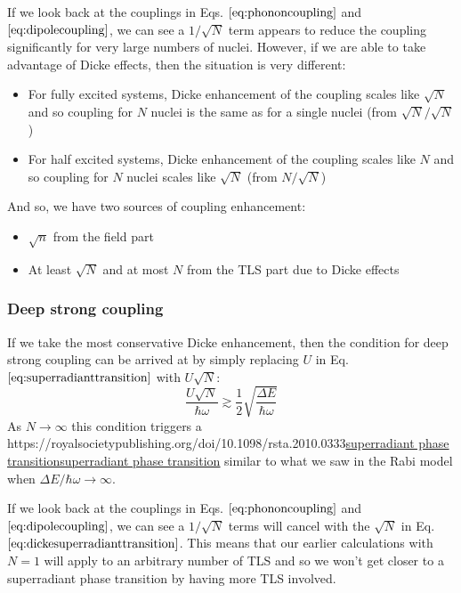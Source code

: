 \documentclass[
]{article}
\let\oldhref\href
\renewcommand{\href}[2]{\ifx#1\urlprefix\oldhref{#1}{#2}\else\uline{\oldhref{#1}{#2}}\fi}
\renewcommand{\[}{\begin{equation}}
\renewcommand{\]}{\end{equation}}
\providecommand{\tightlist}{%
  \setlength{\itemsep}{0pt}\setlength{\parskip}{0pt}}
\begin{document}
If we look back at the couplings in Eqs. \(\ref{eq:phononcoupling}\) and
\(\ref{eq:dipolecoupling}\), we can see a \(1/\sqrt{N}\) term appears to
reduce the coupling significantly for very large numbers of nuclei.
However, if we are able to take advantage of Dicke effects, then the
situation is very different:

\begin{itemize}
\tightlist
\item
  For fully excited systems, Dicke enhancement of the coupling scales
  like \(\sqrt{N}\) and so coupling for \(N\) nuclei is the same as for
  a single nuclei (from \(\sqrt{N}/\sqrt{N}\))
\item
  For half excited systems, Dicke enhancement of the coupling scales
  like \(N\) and so coupling for \(N\) nuclei scales like \(\sqrt{N}\)
  (from \(N/\sqrt{N}\))
\end{itemize}

And so, we have two sources of coupling enhancement:

\begin{itemize}
\tightlist
\item
  \(\sqrt{n}\) from the field part
\item
  At least \(\sqrt{N}\) and at most \(N\) from the TLS part due to Dicke
  effects
\end{itemize}

\subsubsection{Deep strong coupling}\label{deep-strong-coupling-2}

If we take the most conservative Dicke enhancement, then the condition
for deep strong coupling can be arrived at by simply replacing \(U\) in
Eq. \(\ref{eq:superradianttransition}\) with \(U\sqrt{N{}}\): \[
\frac{U\sqrt{N}}{\hbar\omega} \gtrsim \frac{1}{2}\sqrt{\frac{\Delta E}{\hbar\omega}}
\label{eq:dickesuperradianttransition}
\] As \(N\rightarrow \infty\) this condition triggers a
\href{https://royalsocietypublishing.org/doi/10.1098/rsta.2010.0333}{superradiant
phase transition} similar to what we saw in the Rabi model when
\(\Delta E / \hbar\omega \rightarrow \infty\).

If we look back at the couplings in Eqs. \(\ref{eq:phononcoupling}\) and
\(\ref{eq:dipolecoupling}\), we can see a \(1/\sqrt{N}\) terms will
cancel with the \(\sqrt{N}\) in Eq.
\(\ref{eq:dickesuperradianttransition}\). This means that our earlier
calculations with \(N=1\) will apply to an arbitrary number of TLS and
so we won't get closer to a superradiant phase transition by having more
TLS involved.
\end{document}
